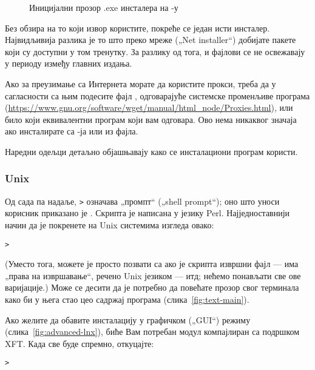 \documentclass{article}
\begin{document}
\begin{figure}[tb]
\begin{center}
  \caption{Иницијални прозор .exe инсталера на \Windows{}-у}\label{fig:nsis}
\end{center}
\end{figure}

Без обзира на то који извор користите, покреће се један исти инсталер.
Највидљивија разлика је то што преко мреже („\textenglish{Net
installer}“) добијате пакете који су доступни у том тренутку. За
разлику од тога, \DVD{} и \ISO{} фајлови се не освежавају у периоду
између главних издања.

Ако за преузимање са Интернета морате да користите прокси, треба да у
сагласности са њим подесите фајл , одговарајуће
системске променљиве програма 
(\url{https://www.gnu.org/software/wget/manual/html_node/Proxies.html}),
или било који еквивалентни програм који вам одговара. Ово нема
никаквог значаја ако инсталирате са \DVD{}-ја или из \ISO{} фајла.

Наредни одељци детаљно објашњавају како се инсталациони програм
користи.

\subsubsection{Unix}

Од сада па надаље, \texttt{>} означава „промпт“ („shell prompt“); оно
што уноси корисник приказано је  .
Скрипта  је написана у језику Perl.
Најједноставнији начин да је покренете на Unix системима изгледа
овако:
\begin{alltt}
> 
\end{alltt}
(Уместо тога, можете је просто позвати са  ако је скрипта извршни фајл --- има
„права на извршавање“, речено Unix језиком --- итд; нећемо понављати
све ове варијације.) Може се десити да је потребно да повећате прозор
свог терминала како би у њега стао цео садржај програма
(слика~\ref{fig:text-main}).

Ако желите да обавите инсталацију у графичком („GUI“) режиму
(слика~\ref{fig:advanced-lnx}), биће Вам потребан
модул  компајлиран са подршком XFT.
Када све буде спремно, откуцајте:
\begin{alltt}> 
\end{alltt}
\end{document}
